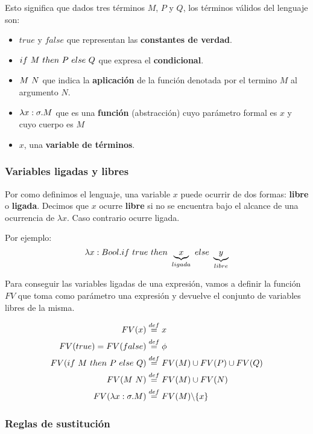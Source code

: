 Esto significa que dados tres términos $M$, $P$ y $Q$, los términos válidos del lenguaje son:
\begin{itemize}
    \item $true$ y $false$ que representan las \textbf{constantes de verdad}.
    \item $ if~ M~ then~ P~ else~ Q$ que expresa el \textbf{condicional}.
    \item $M~N$ que indica la \textbf{aplicación} de la función denotada por el termino $M$ al argumento $N$.
    \item $\lambda x: \sigma . M$ que es una \textbf{función} (abstracción) cuyo parámetro formal es $x$ y cuyo cuerpo es $M$
    \item $x$, una \textbf{variable de términos}.
\end{itemize}

\subsubsection{Variables ligadas y libres}
Por como definimos el lenguaje, una variable $x$ puede ocurrir de dos formas: \textbf{libre} o \textbf{ligada}. Decimos que $x$ ocurre \textbf{libre} si no se encuentra bajo el alcance de una ocurrencia de $\lambda x$. Caso contrario ocurre ligada.

Por ejemplo:
$$\lambda x: Bool . if~ true~ then~ \underbrace{x}_{ligada}~ else~ \underbrace{y}_{libre} $$

Para conseguir las variables ligadas de una expresión, vamos a definir la función $FV$ que toma como parámetro una expresión y devuelve el conjunto de variables libres de la misma.

\begin{equation*}
\begin{split}
FV(x) &\overset{def}{=} {x} \\
FV(true) = FV(false) &\overset{def}{=} \phi \\
FV(if~ M~ then~ P~ else~ Q) &\overset{def}{=} FV(M)\cup FV(P)\cup FV(Q) \\
FV(M~N) &\overset{def}{=} FV(M)\cup FV(N) \\
FV(\lambda x: \sigma . M) &\overset{def}{=} FV(M) \backslash \{x\}
\end{split}
\end{equation*}

\subsubsection{Reglas de sustitución}

